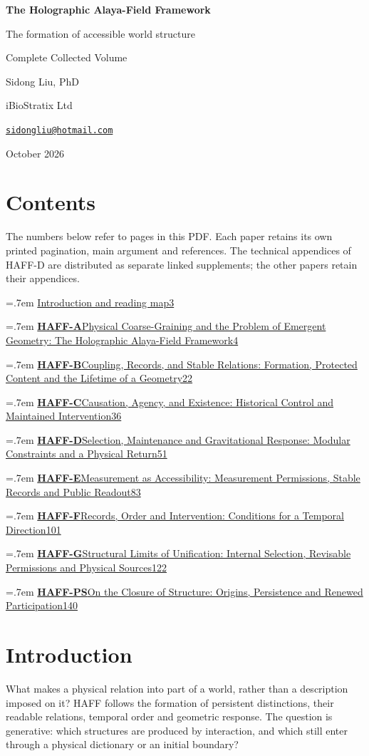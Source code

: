 \documentclass[11pt,a4paper]{article}
\newcommand{\volumeentry}[3]{\par\begingroup\parskip=.7em
  \noindent\href{HAFF_Complete_Collection.pdf\#page=#3}{\textbf{#1}\quad #2\nobreak\dotfill\nobreak\mbox{#3}}\par\endgroup}
\begin{document}
\begin{titlepage}
\centering
\vspace*{1.6cm}
{\Huge\bfseries The Holographic Alaya-Field Framework\par}
\vspace{1cm}
{\Large The formation of accessible world structure\par}
\vfill
{\Large Complete Collected Volume\par}
\vspace{1.6cm}
{\Large Sidong Liu, PhD\par}
\vspace{.3cm}
{iBioStratix Ltd\par}
\href{mailto:sidongliu@hotmail.com}{\texttt{sidongliu@hotmail.com}}\par
\vspace{1cm}
{\large October 2026\par}
\end{titlepage}
\setcounter{page}{2}
\section*{Contents}
The numbers below refer to pages in this PDF. Each paper retains its own printed pagination, main argument and references. The technical appendices of HAFF-D are distributed as separate linked supplements; the other papers retain their appendices.
\volumeentry{}{Introduction and reading map}{3}
\volumeentry{HAFF-A}{Physical Coarse-Graining and the Problem of Emergent Geometry: The Holographic Alaya-Field Framework}{4}
\volumeentry{HAFF-B}{Coupling, Records, and Stable Relations: Formation, Protected Content and the Lifetime of a Geometry}{22}
\volumeentry{HAFF-C}{Causation, Agency, and Existence: Historical Control and Maintained Intervention}{36}
\volumeentry{HAFF-D}{Selection, Maintenance and Gravitational Response: Modular Constraints and a Physical Return}{51}
\volumeentry{HAFF-E}{Measurement as Accessibility: Measurement Permissions, Stable Records and Public Readout}{83}
\volumeentry{HAFF-F}{Records, Order and Intervention: Conditions for a Temporal Direction}{101}
\volumeentry{HAFF-G}{Structural Limits of Unification: Internal Selection, Revisable Permissions and Physical Sources}{122}
\volumeentry{HAFF-PS}{On the Closure of Structure: Origins, Persistence and Renewed Participation}{140}
\clearpage
\section*{Introduction}\label{collection:intro}
What makes a physical relation into part of a world, rather than a description imposed on it? HAFF follows the formation of persistent distinctions, their readable relations, temporal order and geometric response. The question is generative: which structures are produced by interaction, and which still enter through a physical dictionary or an initial boundary?
\end{document}
